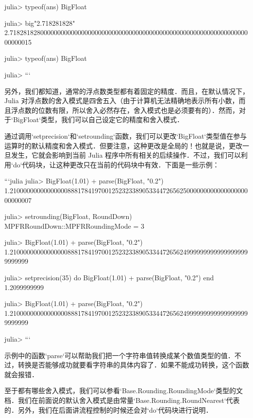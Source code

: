 julia> typeof(ans)
BigFloat

julia> big"2.718281828"
2.718281828000000000000000000000000000000000000000000000000000000000000000000015

julia> typeof(ans)
BigFloat

julia> 
```

另外，我们都知道，通常的浮点数类型都有着固定的精度．而且，在默认情况下，Julia 对浮点数的舍入模式是四舍五入（由于计算机无法精确地表示所有小数，而且浮点数的位数有限，所以舍入必然存在，舍入模式也是必须要有的）．然而，对于`BigFloat`类型，我们可以自己设定它的精度和舍入模式．

通过调用`setprecision`和`setrounding`函数，我们可以更改`BigFloat`类型值在参与运算时的默认精度和舍入模式．但要注意，这种更改是全局的！也就是说，更改一旦发生，它就会影响到当前 Julia 程序中所有相关的后续操作．不过，我们可以利用`do`代码块，让这种更改只在当前的代码块中有效．下面是一些示例：

```julia
julia> BigFloat(1.01) + parse(BigFloat, "0.2")
1.210000000000000008881784197001252323389053344726562500000000000000000000000007

julia> setrounding(BigFloat, RoundDown)
MPFRRoundDown::MPFRRoundingMode = 3

julia> BigFloat(1.01) + parse(BigFloat, "0.2")
1.21000000000000000888178419700125232338905334472656249999999999999999999999999

julia> setprecision(35) do 
           BigFloat(1.01) + parse(BigFloat, "0.2") 
       end
1.2099999999

julia> BigFloat(1.01) + parse(BigFloat, "0.2") 
1.21000000000000000888178419700125232338905334472656249999999999999999999999999

julia> 
```

示例中的函数`parse`可以帮助我们把一个字符串值转换成某个数值类型的值．不过，转换是否能够成功就要看字符串的具体内容了．如果不能成功转换，这个函数就会报错．

至于都有哪些舍入模式，我们可以参看`Base.Rounding.RoundingMode`类型的文档．我们在前面说的默认舍入模式是由常量`Base.Rounding.RoundNearest`代表的．另外，我们在后面讲流程控制的时候还会对`do`代码块进行说明．